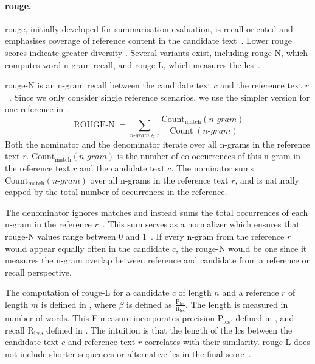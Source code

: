 
\paragraph{\ac{rouge}.}
\ac{rouge}, initially developed for summarisation evaluation, is recall-oriented and emphasises coverage of reference content in the candidate text~\citep{lin_rouge_2004}. 
Lower \ac{rouge} scores indicate greater diversity \citep{kurt_pehlivanoglu_comparative_2024}.
Several variants exist, including \ac{rouge}-N, which computes word n-gram recall, and \ac{rouge}-L, which measures the \ac{lcs}~\citep{zhou_paraphrase_2021,palivela_optimization_2021,kurt_pehlivanoglu_comparative_2024}. 

\ac{rouge}-N is an n-gram recall between the candidate text $c$ and the reference text $r$~\citep{lin_rouge_2004}.
Since we only consider single reference scenarios, we use the simpler version for one reference in .
\begin{equation}
    \operatorname{ROUGE-N} = \sum_{n \text{-} gram \in r} \frac{\operatorname{Count_{match}}(n \text{-} gram)}{\operatorname{Count}(n \text{-} gram)}
\label{eq:rouge_n}
\end{equation}
Both the nominator and the denominator iterate over all n-grams in the reference text $r$.
$\operatorname{Count_{match}}(n \text{-} gram)$ is the number of co-occurrences of this n-gram in the reference text $r$ and the candidate text $c$.
The nominator sums $\operatorname{Count_{match}}(n \text{-} gram)$ over all n-grams in the reference text $r$, and is naturally capped by the total number of occurrences in the reference.

The denominator ignores matches and instead sums the total occurrences of each n-gram in the reference $r$~\citep{lin_rouge_2004}. 
This sum serves as a normalizer which ensures that \ac{rouge}-N values range between 0 and 1~\citep{kurt_pehlivanoglu_comparative_2024}.
%
If every n-gram from the reference $r$ would appear equally often in the candidate $c$, the \ac{rouge}-N would be one since it measures the n-gram overlap between reference and candidate from a reference or recall perspective.


The computation of \ac{rouge}-L for a candidate $c$ of length $n$ and a reference $r$ of length $m$ is defined in , where $\beta$ is defined as $\frac{\mathrm{P_{lcs}}}{\mathrm{R_{lcs}}}$.
The length is measured in number of words.
This F-measure incorporates precision $\mathrm{P_{lcs}}$, defined in , and recall $\mathrm{R_{lcs}}$, defined in .
The intuition is that the length of the \ac{lcs} between the candidate text $c$ and reference text $r$ correlates with their similarity.
\ac{rouge}-L does not include shorter sequences or alternative \ac{lcs} in the final score~\citep{lin_rouge_2004}.

